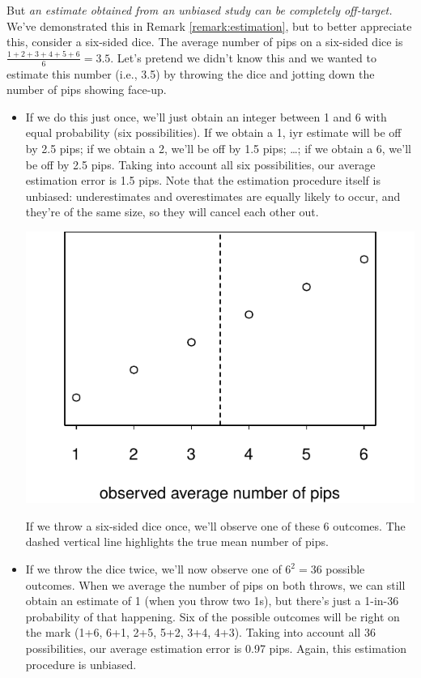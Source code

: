 \documentclass[a4paper]{tufte-book}\usepackage[]{graphicx}\usepackage[]{xcolor}
\begin{document}
But \emph{an estimate obtained from an unbiased study can be completely off-target.}
We've demonstrated this in Remark \ref{remark:estimation},
but to better appreciate this, consider a six-sided dice. 
The average number of pips on a six-sided dice 
is $\frac{1+2+3+4+5+6}{6}=3.5$. Let's pretend
we didn't know this and we wanted to estimate this number (i.e., 3.5) by throwing
the dice and jotting down the number of pips showing face-up.

\begin{itemize}
  \item If we do this just once, we'll just obtain an integer between 1 and 6
  with equal probability (six possibilities). 
  If we obtain a 1, iyr estimate will be off by 2.5 pips;
  if we obtain a 2, we'll be off by 1.5 pips; \dots; 
  if we obtain a 6, we'll be off by 2.5 pips. 
  Taking into account all six possibilities,
  our average estimation error is 1.5 pips. 
  Note that the estimation procedure itself is unbiased: 
  underestimates and overestimates are equally likely to occur,
  and they're of the same size, so they will cancel each other out.

\begin{marginfigure}[-2cm]
\includegraphics[width=\textwidth]{figure/pips_1}
\caption{If we throw a six-sided dice once, we'll observe one of these 6 outcomes.
The dashed vertical line highlights the true mean number of pips.}
\label{fig:pips1}
\end{marginfigure}

  \item If we throw the dice twice,
  we'll now observe one of $6^2 = 36$ possible outcomes. 
  When we average the number of pips on both throws, we can still obtain an estimate of 1 (when
  you throw two 1s), but there's just a 1-in-36 probability of that happening.
  Six of the possible outcomes will be right on the mark
  (1+6, 6+1, 2+5, 5+2, 3+4, 4+3).
  Taking into account all 36 possibilities,
  our average estimation error is 0.97 pips. 
  Again, this estimation procedure is unbiased.
  

\end{itemize}
\end{document}
